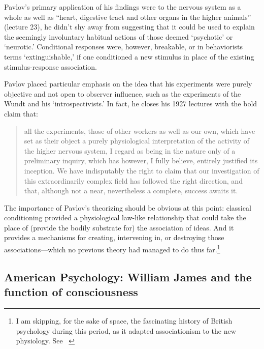 \begin{refsection}
Pavlov's primary application of his findings were to the nervous system as a whole as well as “heart, digestive tract and other organs in the higher animals” (lecture 23), he didn't shy away from suggesting that it could be used to explain the seemingly involuntary habitual actions of those deemed `psychotic' or `neurotic.' Conditional responses were, however, breakable, or in behaviorists terms `extinguishable,' if one conditioned a new stimulus in place of the existing stimulus-response association.

Pavlov placed particular emphasis on the idea that his experiments were purely objective and not open to observer influence, such as the experiments of the Wundt and his ‘introspectivists.’ In fact, he closes his 1927 lectures with the bold claim that:

\begin{quote}

all the experiments, those of other workers as well as our own, which have set as their object a purely physiological interpretation of the activity of the higher nervous system, I regard as being in the nature only of a preliminary inquiry, which has however, I fully believe, entirely justified its inception. We have indisputably the right to claim that our investigation of this extraordinarily complex field has followed the right direction, and that, although not a near, nevertheless a complete, success awaits it. ~\citep{Pavlov:1946ws}
\end{quote}

The importance of Pavlov's theorizing should be obvious at this point: classical conditioning provided a physiological law-like relationship that could take the place of (provide the bodily substrate for) the association of ideas. And it provides a mechanisms for creating, intervening in, or destroying those associations—which no previous theory had managed to do thus far.\footnote{I am skipping, for the sake of space, the fascinating history of British psychology during this period, as it adapted associationism to the new physiology. See ~\citep{Daston:1978vx}}

\subsection{American Psychology: William James and the function of consciousness}
\label{americanpsychology:williamjamesandthefunctionofconsciousness}


\end{refsection}
